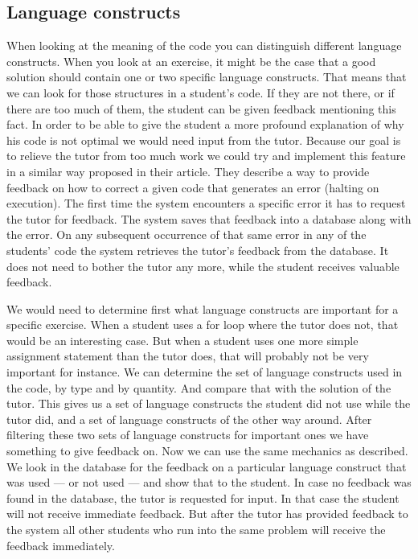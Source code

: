 \subsection{Language constructs}

When looking at the meaning of the code you can distinguish different language
constructs. When you look at an exercise, it might be the case that a good
solution should contain one or two specific language constructs. That means
that we can look for those structures in a student's code. If they are not
there, or if there are too much of them, the student can be given feedback
mentioning this fact. In order to be able to give the student a more profound
explanation of why his code is not optimal we would need input from the
tutor. Because our goal is to relieve the tutor from too much work we could try
and implement this feature in a similar way \citet[Section
3.2]{watson2011learning} proposed in their article. They describe a way to
provide feedback on how to correct a given code that generates an error
(halting on execution). The
first time the system encounters a specific error it has to request the tutor
for feedback. The system saves that feedback into a database along with the
error. On any subsequent occurrence of that same error in any of the students'
code the system retrieves the tutor's feedback from the database. It does not
need to bother the tutor any more, while the student receives valuable
feedback.

We would need to determine first what language constructs are important
for a specific exercise.
When a student uses a for loop where the tutor does not,
that would be an interesting case.
But when a student uses one more simple assignment statement than the
tutor does, that will probably not be very important for instance. We can
determine the set of language constructs used in the code, by type and by
quantity. And compare that with the solution of the tutor. This gives us a set
of language constructs the student did not use while the tutor did, and a set
of language constructs of the other way around. After filtering these two sets
of language constructs for important ones we have something to give feedback
on. Now we can use the same mechanics as \citet{watson2011learning}
described. We look in the database for the feedback on a particular language
construct that was used --- or not used --- and show that to the student. In
case no feedback was found in the database, the tutor is requested for input.
In that case the student will not receive immediate feedback.
But after the tutor has provided feedback to the system
all other students who run into the same problem
will receive the feedback immediately.

